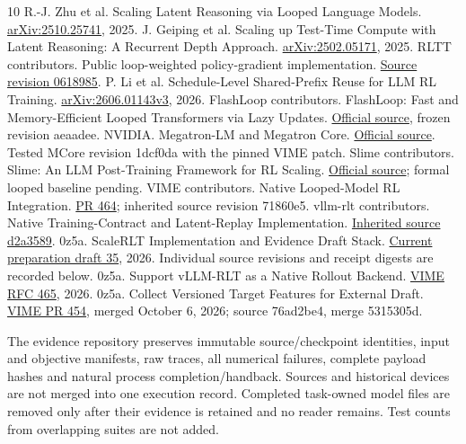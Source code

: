 \documentclass[10pt,twocolumn]{article}
\makeatletter
\renewcommand\section{\@startsection{section}{1}{0pt}{-2.3ex plus -0.5ex minus -0.2ex}{1ex plus 0.2ex}{\large\bfseries\color{ink}}}
\makeatother
\begin{document}
\begin{thebibliography}{10}\small
{} R.-J. Zhu et al. Scaling Latent Reasoning via Looped Language Models. \href{https://arxiv.org/abs/2510.25741}{arXiv:2510.25741}, 2025.
 J. Geiping et al. Scaling up Test-Time Compute with Latent Reasoning: A Recurrent Depth Approach. \href{https://arxiv.org/abs/2502.05171}{arXiv:2502.05171}, 2025.
 RLTT contributors. Public loop-weighted policy-gradient implementation. \href{https://github.com/jonwill8/RLTT/blob/06189850bb23a1b1b715ad29768e68f36b1c4a19/rltt_experiments/verl_rltt/rltt_algos.py}{Source revision 0618985}.
 P. Li et al. Schedule-Level Shared-Prefix Reuse for LLM RL Training. \href{https://arxiv.org/html/2606.01143v3}{arXiv:2606.01143v3}, 2026.
 FlashLoop contributors. FlashLoop: Fast and Memory-Efficient Looped Transformers via Lazy Updates. \href{https://github.com/Superone77/FlashLoop}{Official source}, frozen revision aeaadee.
 NVIDIA. Megatron-LM and Megatron Core. \href{https://github.com/NVIDIA/Megatron-LM}{Official source}. Tested MCore revision 1dcf0da with the pinned VIME patch.
 Slime contributors. Slime: An LLM Post-Training Framework for RL Scaling. \href{https://github.com/THUDM/slime}{Official source}; formal looped baseline pending.
 VIME contributors. Native Looped-Model RL Integration. \href{https://github.com/vllm-project/vime/pull/464}{PR 464}; inherited source revision 71860e5.
 vllm-rlt contributors. Native Training-Contract and Latent-Replay Implementation. \href{https://github.com/0z5a/vllm-rlt/tree/d2a358933393f25d74dd2bdd1068a741cd5d9226}{Inherited source d2a3589}.
 0z5a. ScaleRLT Implementation and Evidence Draft Stack. \href{https://github.com/0z5a/vime/pull/35}{Current preparation draft 35}, 2026. Individual source revisions and receipt digests are recorded below.
 0z5a. Support vLLM-RLT as a Native Rollout Backend. \href{https://github.com/vllm-project/vime/issues/465}{VIME RFC 465}, 2026.
 0z5a. Collect Versioned Target Features for External Draft. \href{https://github.com/vllm-project/vime/pull/454}{VIME PR 454}, merged October 6, 2026; source 76ad2be4, merge 5315305d.
\end{thebibliography}

\clearpage
\appendix
\section{Reproducibility Ledger}\label{app:ledger}
The evidence repository preserves immutable source/checkpoint identities, input and objective manifests, raw traces, all numerical failures, complete payload hashes and natural process completion/handback. Sources and historical devices are not merged into one execution record. Completed task-owned model files are removed only after their evidence is retained and no reader remains. Test counts from overlapping suites are not added.
\end{document}
